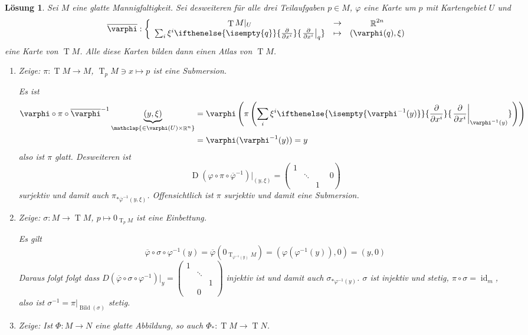 \documentclass[paper=A4, twoside, chapterprefix=true, bibliography=totoc, headsepline]{scrbook}
\let\temp\phi{}
\let\phi\varphi{}
\let\varphi\temp{}
\let\temp\theta{}
\let\theta\vartheta{}
\let\vartheta\temp{}
\let\temp\epsilon{}
\let\epsilon\varepsilon{}
\let\varepsilon\temp{}
\let\temp\rho{}
\let\rho\varrho{}
\let\varrho\temp{}
\DeclareMathOperator{\R}{\mathbb{R}}
\DeclareMathOperator{\Bild}{Bild}
\DeclareMathOperator{\D}{D}         %
\DeclareMathOperator{\Id}{id}       %
\DeclareMathOperator{\T}{T}         %
\newcommand{\X}{\times}
\newcommand{\pdifffrac}[3][]{\ifthenelse{\isempty{#1}}{\frac{\partial #2}{\partial #3}}{\left. \frac{\partial #2}{\partial #3} \right|_{#1}}}
\theoremstyle{plain}
\theoremstyle{nonumberplain}
\theoremstyle{empty}
\theoremstyle{break}
\newtheorem{Loes}{L\"osung}
\begin{document}
\begin{Loes}
Sei $M$ eine glatte Mannigfaltigkeit. Sei desweiteren f\"ur alle drei Teilaufgaben $p \in M$, $\phi$ eine Karte um $p$ mit Kartengebiet $U$ und
	\[ \overline \phi: \left\{ \begin{array}{ccc}  \T M|_U &\to& \R^{2n} \\
		\sum_i \xi^i\pdifffrac[q]{}{x^i} &\mapsto& (\phi(q), \xi) \end{array} \right.\]
eine Karte von $\T M$. Alle diese Karten bilden dann einen Atlas von $\T M$.
\begin{enumerate}[label=\alph*),widest=a,leftmargin=*]
\item
	\emph{Zeige:} $\pi: \T M \to M$, $\T_p M \ni x \mapsto p$ ist eine Submersion.
	
	Es ist
	\begin{align*} \phi \circ \pi \circ \overline \phi^{-1} \underbrace{(y, \xi)}_{\mathclap{\in \phi(U) \X \R^n}} &= \phi\left(\pi\left(\sum_i \xi^i \pdifffrac[\phi^{-1}(y)]{}{x^i}\right)\right)\\
		&= \phi(\phi^{-1}(y)) = y
	\end{align*}
	also ist $\pi$ glatt. Desweiteren ist
		\[ \D(\phi \circ \pi \circ \overline \phi^{-1})|_{(y, \xi)} = \left(\begin{smallmatrix}
        1 &  & \\
        & \ddots & & \\
         & & 1
      \end{smallmatrix} 0\right) \]
     surjektiv und damit auch $\pi_{*\overline\phi^{-1}(y, \xi)}$. Offensichtlich ist $\pi$ surjektiv und damit eine Submersion.
\item
	\emph{Zeige:} $\sigma: M \to \T M$, $p \mapsto 0_{\T_pM}$ ist eine Einbettung.
	
	Es gilt
		\[\overline \phi \circ \sigma \circ \phi^{-1} (y) = \overline \phi(0_{\T_{\phi^{-1}(y)}M}) = (\phi(\phi^{-1}(y)),0) = (y,0) \]
	Daraus folgt folgt dass $D(\overline \phi \circ \sigma \circ \phi^{-1})|_y = \left( \begin{smallmatrix} 1 & &  \\ & \ddots & \\ & & 1 \\ & 0 & \end{smallmatrix} \right)$ injektiv ist und damit auch $\sigma_{* \phi^{-1}(y)}$. $\sigma$ ist injektiv und stetig, $\pi \circ \sigma = \Id_m$, also ist $\sigma^{-1} = \pi|_{\Bild(\sigma)}$ stetig.
\item
	\emph{Zeige:} Ist $\Phi: M \to N$ eine glatte Abbildung, so auch $\Phi_*: \T M \to \T N$.
	

\end{enumerate}
\end{Loes}
\end{document}
